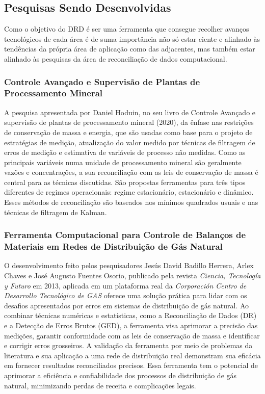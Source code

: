 \subsection{Pesquisas Sendo Desenvolvidas}

Como o objetivo do DRD é ser uma ferramenta que consegue recolher avanços tecnológicos de cada área é de suma importância não só estar ciente e alinhado às tendências da própria área de aplicação como das adjacentes, mas também estar alinhado às pesquisas da área de reconciliação de dados computacional. 

\subsubsection{Controle Avançado e Supervisão de Plantas de Processamento Mineral}

A pesquisa apresentada por Daniel Hoduin, no seu livro de Controle Avançado e supervisão de plantas de processamento mineral (2020), da  ênfase nas restrições de conservação de massa e energia, que são usadas como base para o projeto de estratégias de medição, atualização do valor medido por técnicas de filtragem de erros de medição e estimativa de variáveis de processo não medidas. Como as principais variáveis numa unidade de processamento mineral são geralmente vazões e concentrações, a sua reconciliação com as leis de conservação de massa é central para as técnicas discutidas. São propostas ferramentas para três tipos diferentes de regimes operacionais: regime estacionário, estacionário e dinâmico. Esses métodos de reconciliação são baseados nos mínimos quadrados usuais e nas técnicas de filtragem de Kalman.

\subsubsection{Ferramenta Computacional para Controle de Balanços de Materiais em Redes de Distribuição de Gás Natural}

O desenvolvimento feito pelos pesquisadores Jesús David Badillo Herrera, Arlex Chaves e José Augusto Fuentes Osorio, publicado pela revista \textit{Ciencia, Tecnología y Futuro} em 2013, aplicada em um plataforma real da \textit{Corporación Centro de Desarrollo Tecnológico de GAS} oferece uma solução prática para lidar com os desafios apresentados por erros em sistemas de distribuição de gás natural. Ao combinar técnicas numéricas e estatísticas, como a Reconciliação de Dados (DR) e a Detecção de Erros Brutos (GED), a ferramenta visa aprimorar a precisão das medições, garantir conformidade com as leis de conservação de massa e identificar e corrigir erros grosseiros. A validação da ferramenta por meio de problemas da literatura e sua aplicação a uma rede de distribuição real demonstram sua eficácia em fornecer resultados reconciliados precisos. Essa ferramenta tem o potencial de aprimorar a eficiência e confiabilidade dos processos de distribuição de gás natural, minimizando perdas de receita e complicações legais.


